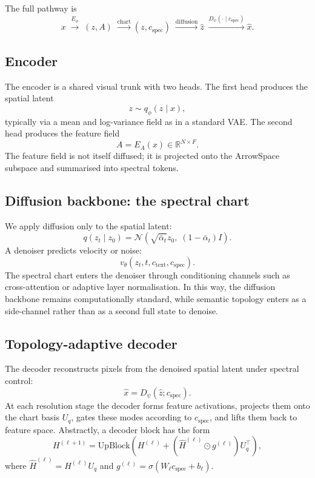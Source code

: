 \documentclass[11pt]{article}
\newcommand{\Uq}{U_q}
\newcommand{\R}{\mathbb{R}}
\begin{document}
The full pathway is
\[x \;\xrightarrow{E_\phi}\; (z, A) \;\xrightarrow{\text{chart}} (z, c_{\mathrm{spec}}) \;\xrightarrow{\text{diffusion}} \hat z \;\xrightarrow{D_\psi(\cdot \mid c_{\mathrm{spec}})} \hat x.\]

\subsection{Encoder}
\label{sec:encoder}

The encoder is a shared visual trunk with two heads. The first head produces
the spatial latent
\[z \sim q_\phi(z \mid x),\]
typically via a mean and log-variance field as in a standard VAE. The second
head produces the feature field
\[A = E_A(x) \in \R^{N \times F}.\]
The feature field is not itself diffused; it is projected onto the ArrowSpace
subspace and summarised into spectral tokens.

\subsection{Diffusion backbone: the spectral chart}
\label{sec:backbone}

We apply diffusion only to the spatial latent:
\[q(z_t \mid z_0) = \mathcal{N} \left( \sqrt{\bar\alpha_t} z_0,\; (1-\bar\alpha_t)I \right).\]
A denoiser predicts velocity or noise:
\[v_\theta(z_t, t, c_{\mathrm{text}}, c_{\mathrm{spec}}).\]
The spectral chart enters the denoiser through conditioning channels such as
cross-attention or adaptive layer normalisation. In this way, the diffusion
backbone remains computationally standard, while semantic topology enters as a
side-channel rather than as a second full state to denoise.

\subsection{Topology-adaptive decoder}
\label{sec:decoder}

The decoder reconstructs pixels from the denoised spatial latent under
spectral control:
\[\hat x = D_\psi(\hat z; c_{\mathrm{spec}}).\]
At each resolution stage the decoder forms feature activations, projects them
onto the chart basis $\Uq$, gates these modes according to
$c_{\mathrm{spec}}$, and lifts them back to feature space. Abstractly, a
decoder block has the form
\[H^{(\ell+1)} = \mathrm{UpBlock} \left( H^{(\ell)} + (\hat H^{(\ell)} \odot g^{(\ell)})\Uq^\top \right),\]
where $\hat H^{(\ell)} = H^{(\ell)}\Uq$ and
$g^{(\ell)} = \sigma(W_\ell c_{\mathrm{spec}} + b_\ell)$.
\end{document}
